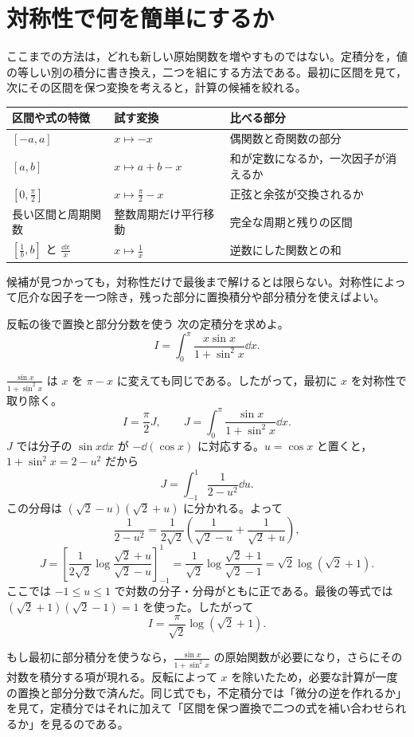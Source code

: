 \section{対称性で何を簡単にするか}\label{節:定積分の手法選択}

ここまでの方法は，どれも新しい原始関数を増やすものではない。定積分を，値の等しい別の積分に書き換え，二つを組にする方法である。最初に区間を見て，次にその区間を保つ変換を考えると，計算の候補を絞れる。

\begin{center}
\begin{tabularx}{0.96\linewidth}{@{}lXX@{}}
\toprule
区間や式の特徴 & 試す変換 & 比べる部分\\
\midrule
$[-a,a]$ & $x\mapsto -x$ & 偶関数と奇関数の部分\\
$[a,b]$ & $x\mapsto a+b-x$ & 和が定数になるか，一次因子が消えるか\\
$\left[0,\frac{\pi}{2}\right]$ & $x\mapsto\frac{\pi}{2}-x$ & 正弦と余弦が交換されるか\\
長い区間と周期関数 & 整数周期だけ平行移動 & 完全な周期と残りの区間\\
$\left[\frac1b,b\right]$ と $\frac{\dd x}{x}$ & $x\mapsto\frac1x$ & 逆数にした関数との和\\
\bottomrule
\end{tabularx}
\end{center}

候補が見つかっても，対称性だけで最後まで解けるとは限らない。対称性によって厄介な因子を一つ除き，残った部分に置換積分や部分積分を使えばよい。

\begin{example}{反転の後で置換と部分分数を使う}
次の定積分を求めよ。
\[
I=\int_0^\pi\frac{x\sin x}{1+\sin^2x}\dd x.
\]
\end{example}

$\frac{\sin x}{1+\sin^2x}$ は $x$ を $\pi-x$ に変えても同じである。したがって，最初に $x$ を対称性で取り除く。
\[
I=\frac{\pi}{2}J,\qquad
J=\int_0^\pi\frac{\sin x}{1+\sin^2x}\dd x.
\]
$J$ では分子の $\sin x\dd x$ が $-\dd(\cos x)$ に対応する。$u=\cos x$ と置くと，$1+\sin^2x=2-u^2$ だから
\[
J=\int_{-1}^1\frac{1}{2-u^2}\dd u.
\]
この分母は $(\sqrt2-u)(\sqrt2+u)$ に分かれる。よって
\[
\frac{1}{2-u^2}
 =\frac{1}{2\sqrt2}\left(\frac{1}{\sqrt2-u}+\frac{1}{\sqrt2+u}\right),
\]
\[
J=\left[\frac{1}{2\sqrt2}
\log\frac{\sqrt2+u}{\sqrt2-u}\right]_{-1}^1
 =\frac{1}{\sqrt2}\log\frac{\sqrt2+1}{\sqrt2-1}
 =\sqrt2\log(\sqrt2+1).
\]
ここでは $-1\leq u\leq1$ で対数の分子・分母がともに正である。最後の等式では $(\sqrt2+1)(\sqrt2-1)=1$ を使った。したがって
\[
I=\frac{\pi}{\sqrt2}\log(\sqrt2+1).
\]

もし最初に部分積分を使うなら，$\frac{\sin x}{1+\sin^2x}$ の原始関数が必要になり，さらにその対数を積分する項が現れる。反転によって $x$ を除いたため，必要な計算が一度の置換と部分分数で済んだ。同じ式でも，不定積分では「微分の逆を作れるか」を見て，定積分ではそれに加えて「区間を保つ置換で二つの式を補い合わせられるか」を見るのである。

